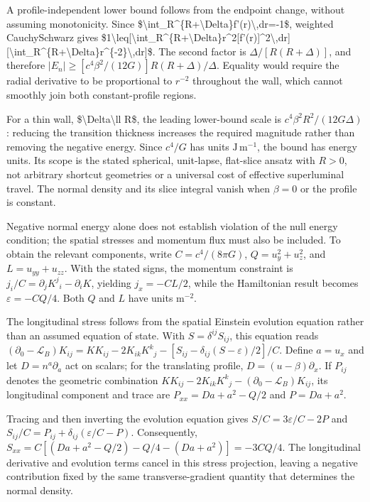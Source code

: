 \documentclass[11pt]{article}
\begin{document}
A profile-independent lower bound follows from the endpoint change, without assuming monotonicity. Since \$\textbackslash{}int\_R\textasciicircum{}\{R+\textbackslash{}Delta\}f'(r)\textbackslash{},dr=-1\$, weighted Cauchy\textendash{}Schwarz gives \$1\textbackslash{}leq[\textbackslash{}int\_R\textasciicircum{}\{R+\textbackslash{}Delta\}r\textasciicircum{}2[f'(r)]\textasciicircum{}2\textbackslash{},dr][\textbackslash{}int\_R\textasciicircum{}\{R+\textbackslash{}Delta\}r\textasciicircum{}\{-2\}\textbackslash{},dr]\$. The second factor is $\Delta/[R(R+\Delta)]$, and therefore $|E_n|\geq[c^4\beta^2/(12G)]R(R+\Delta)/\Delta$. Equality would require the radial derivative to be proportional to $r^{-2}$ throughout the wall, which cannot smoothly join both constant-profile regions.

For a thin wall, \$\textbackslash{}Delta\textbackslash{}ll R\$, the leading lower-bound scale is $c^4\beta^2R^2/(12G\Delta)$: reducing the transition thickness increases the required magnitude rather than removing the negative energy. Since $c^4/G$ has units $\mathrm{J\,m^{-1}}$, the bound has energy units. Its scope is the stated spherical, unit-lapse, flat-slice ansatz with $R>0$, not arbitrary shortcut geometries or a universal cost of effective superluminal travel. The normal density and its slice integral vanish when $\beta=0$ or the profile is constant.

Negative normal energy alone does not establish violation of the null energy condition; the spatial stresses and momentum flux must also be included. To obtain the relevant components, write $C=c^4/(8\pi G)$, $Q=u_y^2+u_z^2$, and $L=u_{yy}+u_{zz}$. With the stated signs, the momentum constraint is $j_i/C=\partial_jK^j{}_i-\partial_iK$, yielding $j_x=-CL/2$, while the Hamiltonian result becomes $\varepsilon=-CQ/4$. Both $Q$ and $L$ have units $\mathrm{m^{-2}}$.

The longitudinal stress follows from the spatial Einstein evolution equation rather than an assumed equation of state. With $S=\delta^{ij}S_{ij}$, this equation reads $(\partial_0-\mathcal L_B)K_{ij}=KK_{ij}-2K_{ik}K^k{}_j-[S_{ij}-\delta_{ij}(S-\varepsilon)/2]/C$. Define $a=u_x$ and let $D=n^a\partial_a$ act on scalars; for the translating profile, $D=(u-\beta)\partial_x$. If $P_{ij}$ denotes the geometric combination $KK_{ij}-2K_{ik}K^k{}_j-(\partial_0-\mathcal L_B)K_{ij}$, its longitudinal component and trace are $P_{xx}=Da+a^2-Q/2$ and $P=Da+a^2$.

Tracing and then inverting the evolution equation gives $S/C=3\varepsilon/C-2P$ and $S_{ij}/C=P_{ij}+\delta_{ij}(\varepsilon/C-P)$. Consequently, $S_{xx}=C[(Da+a^2-Q/2)-Q/4-(Da+a^2)]=-3CQ/4$. The longitudinal derivative and evolution terms cancel in this stress projection, leaving a negative contribution fixed by the same transverse-gradient quantity that determines the normal density.
\end{document}
